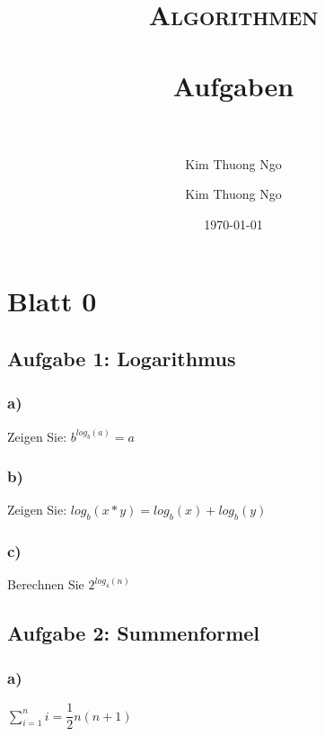 \documentclass[paper=a4, fontsize=11pt]{scrartcl}
\author{Kim Thuong Ngo}
\title{	
\normalfont \normalsize 
\textsc{Algorithmen} \\ [25pt] 
\horrule{0.5pt} \\[0.4cm] 
\huge Aufgaben \\ 
\horrule{2pt} \\[0.5cm] 
}
\author{Kim Thuong Ngo}
\date{\normalsize\today}
\numberwithin{equation}{section}
\numberwithin{figure}{section}
\numberwithin{table}{section}
\begin{document}
\maketitle 

\newpage

\tableofcontents


\newpage

\section{Blatt 0}


\subsection{Aufgabe 1: Logarithmus}

\subsubsection*{a)}

Zeigen Sie: $b^{log_{b}(a)} = a$

\subsubsection*{b)}

Zeigen Sie: $log_{b}(x*y) = log_{b}(x) + log_{b}(y)$

\subsubsection*{c)}

Berechnen Sie $2^{log_{4}(n)}$


\subsection{Aufgabe 2: Summenformel}

\subsubsection*{a)}

$\sum^{n}_{i=1} i = \dfrac{1}{2} n (n+1)$
\end{document}
